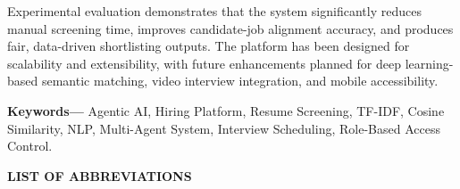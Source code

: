 \documentclass[12pt,a4paper]{report}
\renewcommand{\headrulewidth}{0.4pt}
\renewcommand{\footrulewidth}{0.4pt}
\renewcommand{\headrulewidth}{0pt}
\renewcommand{\footrulewidth}{0.4pt}
\begin{document}
Experimental evaluation demonstrates that the system significantly reduces manual screening time, improves candidate-job alignment accuracy, and produces fair, data-driven shortlisting outputs. The platform has been designed for scalability and extensibility, with future enhancements planned for deep learning-based semantic matching, video interview integration, and mobile accessibility.

\textbf{Keywords---} Agentic AI, Hiring Platform, Resume Screening, TF-IDF, Cosine Similarity, NLP, Multi-Agent System, Interview Scheduling, Role-Based Access Control.
\clearpage

\clearpage
\pagestyle{fancy}
\fancyhf{}
\fancyfoot[C]{\thepage}
\renewcommand{\headrulewidth}{0pt}
\renewcommand{\footrulewidth}{0.4pt}

\tableofcontents
\clearpage

\clearpage
{}
\listoffigures
\clearpage

\clearpage
{}
\listoftables
\clearpage

\clearpage
{}
\begin{center}
    {\large\bfseries LIST OF ABBREVIATIONS}
\end{center}
\vspace{0.5cm}
\end{document}
